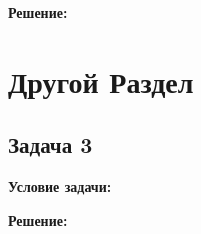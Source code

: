 \documentclass[a4paper,12pt]{article}
\begin{document}
\textbf{Решение:}


\vspace{1cm}

% 
% 
% 
% 

\section{Другой Раздел}

\subsection{Задача 3}
\textbf{Условие задачи:}


\textbf{Решение:}


\vspace{1cm}

\end{document}
